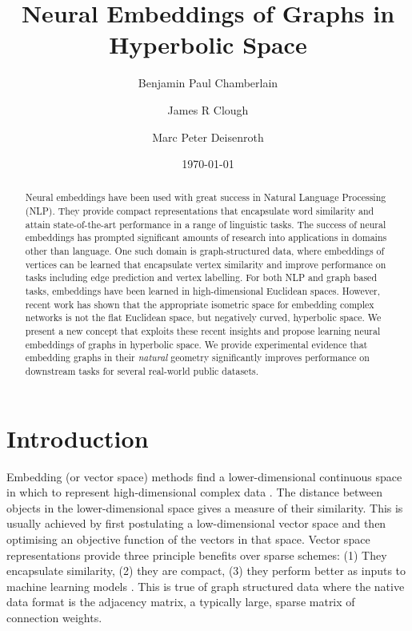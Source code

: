 \documentclass[sigconf, review]{acmart}
\author{Benjamin Paul Chamberlain}
\affiliation{
  \department{Department of Computing}
  \institution{Imperial College London}
}
\author{James R Clough}
\affiliation{
  \department{Centre for Complexity Science}
  \institution{Imperial College London}
}
\author{Marc Peter Deisenroth}
\affiliation{
  \department{Department of Computing}
  \institution{Imperial College London}
}
\date{\today}
\begin{document}
\title{Neural Embeddings of Graphs in Hyperbolic Space}

\begin{abstract}
Neural embeddings have been used with great success in Natural Language Processing (NLP). They provide compact representations that encapsulate word similarity and attain state-of-the-art performance in a range of linguistic tasks. The success of neural embeddings has prompted significant amounts of research into applications in domains other than language. One such domain is graph-structured data, where embeddings of vertices can be learned that encapsulate vertex similarity and improve performance on tasks including edge prediction and vertex labelling. For both NLP and graph based tasks, embeddings have been learned in high-dimensional Euclidean spaces.
However, recent work has shown that the appropriate isometric space for embedding complex networks is not the flat Euclidean space, but negatively curved, hyperbolic space. We present a new concept that exploits these recent insights and propose learning neural embeddings of graphs in hyperbolic space. We provide experimental evidence that embedding graphs in their \emph{natural} geometry significantly improves performance on downstream tasks for several real-world public datasets. 
\end{abstract}


\maketitle

\section{Introduction}
Embedding (or vector space) methods find a lower-dimensional continuous space in which to represent high-dimensional complex data \cite{Roweis2000, Belkin2001}.  The distance between objects in the lower-dimensional space gives a measure of their similarity. This is usually achieved by first postulating a low-dimensional vector space and then optimising an objective function of the vectors in that space. 
Vector space representations provide three principle benefits over sparse schemes: (1) They encapsulate similarity, (2) they are compact, (3) they perform better as inputs to machine learning models \cite{Salton1975}.
This is true of graph structured data where the native data format is the adjacency matrix, a typically large, sparse matrix of connection weights. 
\end{document}
